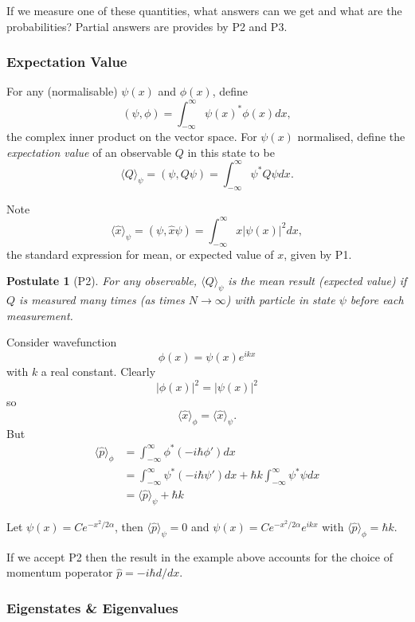 \documentclass[a4paper]{article}
\newtheorem*{postulate}{Postulate}
\begin{document}
If we measure one of these quantities, what answers can we get and what are the probabilities? Partial answers are provides by P2 and P3.

\subsubsection{Expectation Value}

For any (normalisable) $\psi(x)$ and $\phi(x)$, define
\[
  (\psi, \phi) = \int_{-\infty}^\infty \psi(x)^* \phi(x) dx,
\]
the complex inner product on the vector space. For $\psi(x)$ normalised, define the \emph{expectation value} of an observable $Q$ in this state to be
\[
  \langle Q \rangle_\psi = (\psi, Q\psi) = \int_{-\infty}^\infty \psi^* Q\psi dx.
\]

Note
\[
  \langle \hat x \rangle_\psi = (\psi, \hat x \psi) = \int_{-\infty}^\infty x |\psi(x)|^2 dx,
\]
the standard expression for mean, or expected value of $x$, given by P1.

\begin{postulate}[P2]
  \label{postulate:2}
  For any observable, $\langle Q\rangle_\psi$ is the mean result (expected value) if $Q$ is measured many times (as times $N\to\infty$) with particle in state $\psi$ before each measurement.
\end{postulate}

Consider wavefunction
\[
  \phi(x) = \psi(x)e^{ikx}
\]
with $k$ a real constant. Clearly
\[
  |\phi(x)|^2 = |\psi(x)|^2
\]
so
\[
  \langle \hat x\rangle_\phi = \langle \hat x\rangle_\psi.
\]
But
\begin{align*}
  \langle\hat p\rangle_\phi &= \int_{-\infty}^\infty \phi^*(-i\hbar\phi')dx \\
  &= \int_{-\infty}^\infty \psi^*(-i\hbar\psi')dx + \hbar k\int_{-\infty}^\infty \psi^*\psi dx \\
  &= \langle \hat p\rangle_\psi + \hbar k
\end{align*}

\begin{eg}
  Let $\psi(x) = Ce^{-x^2/2\alpha}$, then $\langle\hat p\rangle_\psi = 0$ and $\psi(x) = Ce^{-x^2/2\alpha}e^{ikx}$ with $\langle\hat p\rangle_\phi = \hbar k$.
\end{eg}

If we accept P2 then the result in the example above accounts for the choice of momentum poperator \(\hat p = -i\hbar d/dx\).

\subsubsection{Eigenstates \& Eigenvalues}
\end{document}
